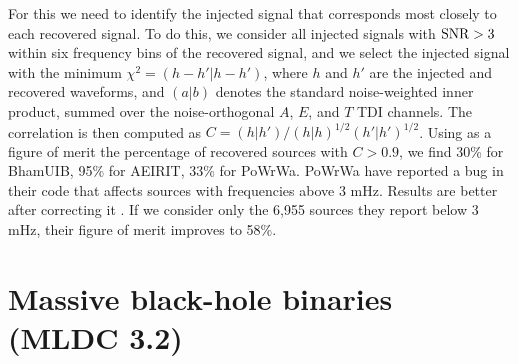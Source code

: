 \documentclass{iopart}
\begin{document}
For this we need to identify the injected signal that corresponds most closely to each recovered signal. To do this, we consider all injected signals with ${\rm SNR} > 3$ within six frequency bins of the recovered signal, and we select the injected signal with the minimum $\chi^2 = (h-h' \vert h-h')$,
where $h$ and $h'$ are the injected and recovered waveforms, and $(a\vert b)$ denotes the standard noise-weighted inner product, summed over the noise-orthogonal $A$, $E$, and $T$ TDI channels. The correlation is then computed as $C = (h \vert h')/
(h \vert h)^{1/2} (h' \vert h')^{1/2}$. Using as a figure of merit the percentage of recovered sources with $C > 0.9$, we find 30\% for BhamUIB, 95\% for AEIRIT, 33\% for PoWrWa. PoWrWa have reported a bug in their code that affects sources with frequencies above 3 mHz. Results are better after correcting it \cite{babaknew}. If we consider only the 6,955 sources they report below 3 mHz, their figure of merit improves to 58\%.

\section{Massive black-hole binaries (MLDC 3.2)}
\end{document}
